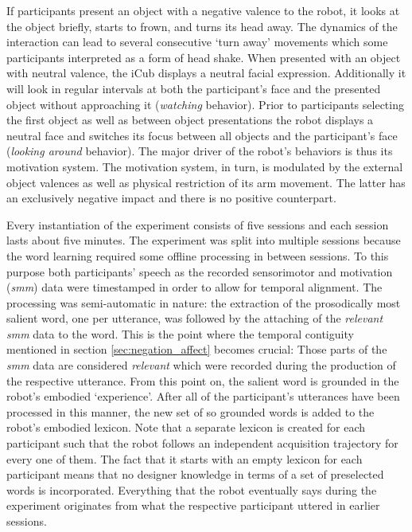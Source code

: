 If participants present an object with a negative valence to the robot, it looks at the object briefly, starts to frown, and turns its head away.
The dynamics of the interaction can lead to several consecutive `turn away' movements which some participants interpreted as a form of head shake.
When presented with an object with neutral valence, the iCub displays a neutral facial expression. Additionally it will look in regular intervals at both
the participant's face and the presented object without approaching it (\emph{watching} behavior).
Prior to participants selecting the first object as well as between object presentations the robot displays a neutral face and switches its focus between all objects 
and the participant's face (\emph{looking around} behavior). The major driver of the robot's behaviors is thus its motivation system. The motivation system, in turn,
is modulated by the external object valences as well as physical restriction of its arm movement. The latter has an exclusively negative impact and there is no
positive counterpart.

Every instantiation of the experiment consists of five sessions and each session lasts about five minutes. The experiment was split into multiple sessions
because the word learning required some offline processing in between sessions. To this purpose both participants' speech as the recorded sensorimotor and motivation
(\emph{smm}) data were timestamped in order to allow for temporal alignment. The processing was semi-automatic in nature: the extraction of the prosodically most salient
word, one per utterance, was followed by the attaching of the \emph{relevant} \emph{smm} data to the word. This is the point where the temporal contiguity mentioned
in section \ref{sec:negation_affect} becomes crucial: Those parts of the \emph{smm} data are considered \emph{relevant} which were recorded
during the production of the respective utterance. From this point on, the salient word is grounded in the robot's embodied `experience'. After all of the participant's
utterances have been processed in this manner, the new set of so grounded words is added to the robot's embodied lexicon.
Note that a separate lexicon is created for each participant such that the robot follows an independent acquisition trajectory for every one of them.
The fact that it starts with an empty lexicon for each participant means that no designer knowledge in terms of a set of preselected words is incorporated.
Everything that the robot eventually says during the experiment originates from what the respective participant uttered in earlier sessions.

